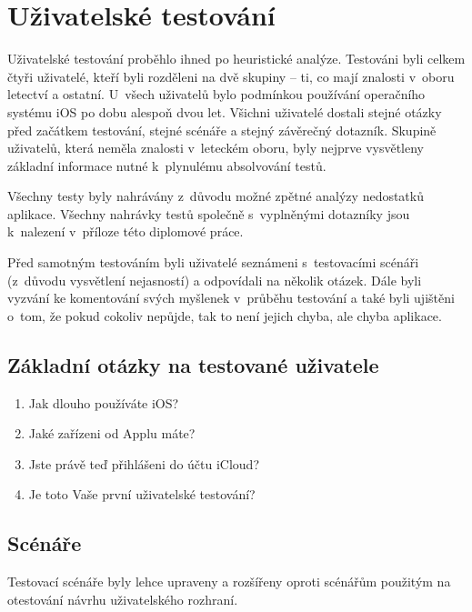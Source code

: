 \documentclass[thesis=M,czech]{FITthesis}[2012/06/26]
\begin{document}
\section{Uživatelské testování}
Uživatelské testování proběhlo ihned po heuristické analýze. Testováni byli celkem čtyři uživatelé, kteří byli rozděleni na dvě skupiny -- ti, co mají znalosti v~oboru letectví a ostatní. U~všech uživatelů bylo podmínkou používání operačního systému iOS po dobu alespoň dvou let. Všichni uživatelé dostali stejné otázky před začátkem testování, stejné scénáře a stejný závěrečný dotazník. Skupině uživatelů, která neměla znalosti v~leteckém oboru, byly nejprve vysvětleny základní informace nutné k~plynulému absolvování testů.

Všechny testy byly nahrávány z~důvodu možné zpětné analýzy nedostatků aplikace. Všechny nahrávky testů společně s~vyplněnými dotazníky jsou k~nalezení v~příloze této diplomové práce.

Před samotným testováním byli uživatelé seznámeni s~testovacími scénáři (z~důvodu vysvětlení nejasností) a odpovídali na několik otázek. Dále byli vyzvání ke komentování svých myšlenek v~průběhu testování a také byli ujištěni o~tom, že pokud cokoliv nepůjde, tak to není jejich chyba, ale chyba aplikace.

\subsection{Základní otázky na testované uživatele}
\begin{enumerate}
\item Jak dlouho používáte iOS?
\item Jaké zařízeni od Applu máte?
\item Jste právě teď přihlášeni do účtu iCloud?
\item Je toto Vaše první uživatelské testování?
\end{enumerate}

\subsection{Scénáře}
Testovací scénáře byly lehce upraveny a rozšířeny oproti scénářům použitým na otestování návrhu uživatelského rozhraní.
\end{document}
